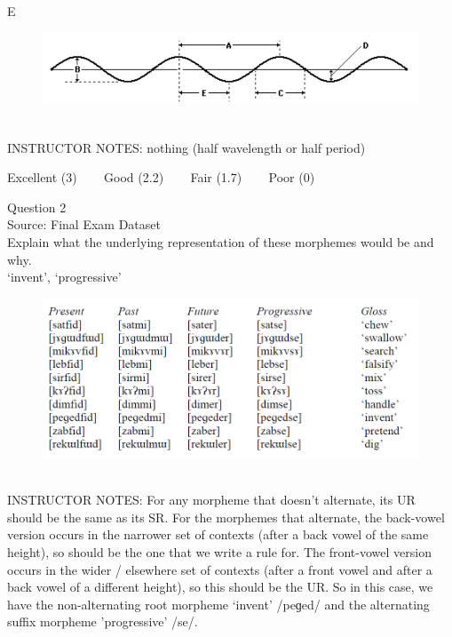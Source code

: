 \documentclass[12pt]{article}
\begin{document}
E

\begin{figure}[H]
\includegraphics{../images/sinusoid.png}
\end{figure}

~\\
INSTRUCTOR NOTES: nothing (half wavelength or half period)


\vfill
Excellent (3) ~~~ Good (2.2) ~~~ Fair (1.7) ~~~ Poor (0)
\newpage

{\large Question 2}\\

Source: Final Exam Dataset\\

Explain what the underlying representation of these morphemes would be and why.\\

`invent', `progressive'

\begin{figure}[H]
\includegraphics{../images/final_dataset.png}
\end{figure}

~\\
INSTRUCTOR NOTES: For any morpheme that doesn’t alternate, its UR should be the same as its SR.  For the morphemes that alternate, the back-vowel version occurs in the narrower set of contexts (after a back vowel of the same height), so should be the one that we write a rule for. The front-vowel version occurs in the wider / elsewhere set of contexts (after a front vowel and after a back vowel of a different height), so this should be the UR. So in this case, we have the non-alternating root morpheme ‘invent’ /peɡed/ and the alternating suffix morpheme 'progressive' /se/.
\end{document}
